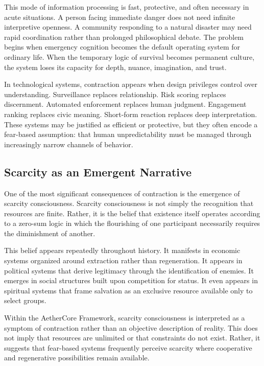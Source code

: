 \documentclass[12pt]{article}
\begin{document}
This mode of information processing is fast, protective, and often necessary in acute situations. A person facing immediate danger does not need infinite interpretive openness. A community responding to a natural disaster may need rapid coordination rather than prolonged philosophical debate. The problem begins when emergency cognition becomes the default operating system for ordinary life. When the temporary logic of survival becomes permanent culture, the system loses its capacity for depth, nuance, imagination, and trust.

In technological systems, contraction appears when design privileges control over understanding. Surveillance replaces relationship. Risk scoring replaces discernment. Automated enforcement replaces human judgment. Engagement ranking replaces civic meaning. Short-form reaction replaces deep interpretation. These systems may be justified as efficient or protective, but they often encode a fear-based assumption: that human unpredictability must be managed through increasingly narrow channels of behavior.

\subsection{Scarcity as an Emergent Narrative}

One of the most significant consequences of contraction is the emergence of scarcity consciousness. Scarcity consciousness is not simply the recognition that resources are finite. Rather, it is the belief that existence itself operates according to a zero-sum logic in which the flourishing of one participant necessarily requires the diminishment of another.

This belief appears repeatedly throughout history. It manifests in economic systems organized around extraction rather than regeneration. It appears in political systems that derive legitimacy through the identification of enemies. It emerges in social structures built upon competition for status. It even appears in spiritual systems that frame salvation as an exclusive resource available only to select groups.

Within the AetherCore Framework, scarcity consciousness is interpreted as a symptom of contraction rather than an objective description of reality. This does not imply that resources are unlimited or that constraints do not exist. Rather, it suggests that fear-based systems frequently perceive scarcity where cooperative and regenerative possibilities remain available.
\end{document}
